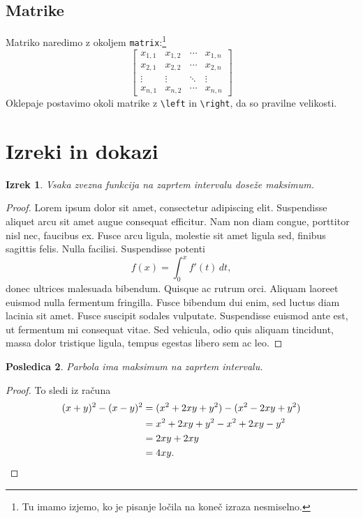 \documentclass{amsart}
\newtheorem{izrek}{Izrek}[section]
\newtheorem{posledica}[izrek]{Posledica}
\begin{document}
\subsection{Matrike}

Matriko naredimo z okoljem \texttt{matrix}:\footnote{Tu imamo izjemo, ko je pisanje ločila
  na koneč izraza nesmiselno.}
%
\begin{equation*}
  \left[
  \begin{matrix}
    x_{1,1} & x_{1,2} & \cdots & x_{1,n} \\
    x_{2,1} & x_{2,2} & \cdots & x_{2,n} \\
    \vdots  & \vdots  & \ddots & \vdots  \\
    x_{n,1} & x_{n,2} & \cdots & x_{n,n}
  \end{matrix}
  \right]
\end{equation*}
%
Oklepaje postavimo okoli matrike z \verb|\left| in \verb|\right|, da so pravilne
velikosti.

\section{Izreki in dokazi}
\label{sec:izreki-dokazi}

\begin{izrek}
  \label{izrek:max-zvezna}
  Vsaka zvezna funkcija na zaprtem intervalu doseže maksimum.
\end{izrek}

\begin{proof}
  Lorem ipsum dolor sit amet, consectetur adipiscing elit. Suspendisse aliquet arcu sit
  amet augue consequat efficitur. Nam non diam congue, porttitor nisl nec, faucibus ex.
  Fusce arcu ligula, molestie sit amet ligula sed, finibus sagittis felis. Nulla facilisi.
  Suspendisse potenti
  \[
    f(x) = \int_0^x f'(t) \, d t,
  \]
  donec ultrices malesuada bibendum. Quisque ac rutrum orci. Aliquam
  laoreet euismod nulla fermentum fringilla. Fusce bibendum dui enim, sed luctus diam
  lacinia sit amet. Fusce suscipit sodales vulputate. Suspendisse euismod ante est, ut
  fermentum mi consequat vitae. Sed vehicula, odio quis aliquam tincidunt, massa dolor
  tristique ligula, tempus egestas libero sem ac leo.
\end{proof}

\begin{posledica}
  Parbola ima maksimum na zaprtem intervalu.
\end{posledica}

\begin{proof}
  To sledi iz računa
  \begin{align*}
    (x + y)^2 - (x - y)^2
    &= (x^2 + 2 x y + y^2) - (x^2 - 2 x y + y^2) \\
    &= x^2 + 2 x y + y^2 - x^2 + 2 x y - y^2 \\
    &= 2 x y + 2 x y \\
    &= 4 x y. \qedhere
  \end{align*}
\end{proof}
\end{document}
